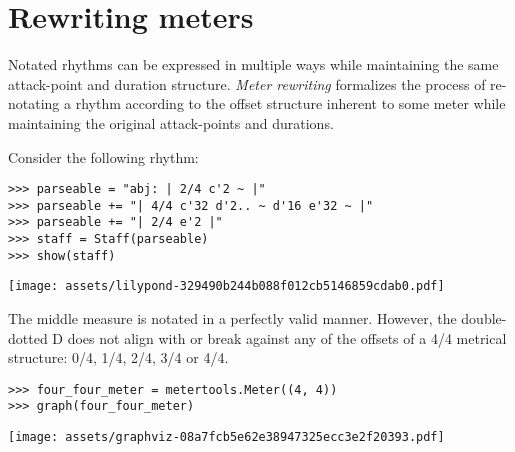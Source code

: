 \section{Rewriting meters}

Notated rhythms can be expressed in multiple ways while maintaining the same
attack-point and duration structure. \emph{Meter rewriting} formalizes the
process of re-notating a rhythm according to the offset structure inherent to
some meter while maintaining the original attack-points and durations.

Consider the following rhythm:

\begin{comment}
<abjad>
parseable = "abj: | 2/4 c'2 ~ |"
parseable += "| 4/4 c'32 d'2.. ~ d'16 e'32 ~ |"
parseable += "| 2/4 e'2 |"
staff = Staff(parseable)
show(staff)
</abjad>
\end{comment}

\begin{singlespacing}
\vspace{-0.5\baselineskip}
\begin{lstlisting}
>>> parseable = "abj: | 2/4 c'2 ~ |"
>>> parseable += "| 4/4 c'32 d'2.. ~ d'16 e'32 ~ |"
>>> parseable += "| 2/4 e'2 |"
>>> staff = Staff(parseable)
>>> show(staff)
\end{lstlisting}
\texttt{[image: assets/lilypond-329490b244b088f012cb5146859cdab0.pdf]}
\end{singlespacing}

The middle measure is notated in a perfectly valid manner. However, the
double-dotted D does not align with or break against any of the offsets of a
4/4 metrical structure: 0/4, 1/4, 2/4, 3/4 or 4/4.

\begin{comment}
<abjad>
four_four_meter = metertools.Meter((4, 4))
graph(four_four_meter)
</abjad>
\end{comment}

\begin{singlespacing}
\vspace{-0.5\baselineskip}
\begin{lstlisting}
>>> four_four_meter = metertools.Meter((4, 4))
>>> graph(four_four_meter)
\end{lstlisting}
\texttt{[image: assets/graphviz-08a7fcb5e62e38947325ecc3e2f20393.pdf]}
\end{singlespacing}

